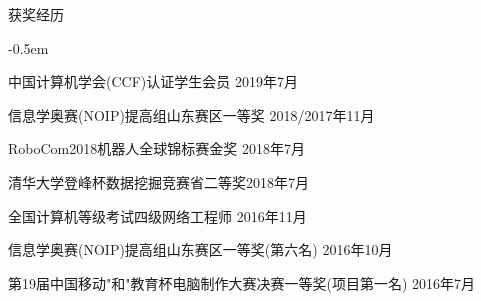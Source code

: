 \documentclass[UTF8]{resume} %
\begin{document}
\begin{rSection}{获奖经历}
    \begin{list}{}{
        \setlength{\leftmargin}{0.0em}
        \itemsep -0.5em
      }

    
    \item 中国计算机学会(CCF)认证学生会员 \hfill 2019年7月

    \item 信息学奥赛(NOIP)提高组山东赛区一等奖 \hfill 2018/2017年11月
    \item RoboCom2018机器人全球锦标赛金奖 \hfill 2018年7月
    \item 清华大学登峰杯数据挖掘竞赛省二等奖\hfill 2018年7月
    \item 全国计算机等级考试四级网络工程师 \hfill 2016年11月
    \item 信息学奥赛(NOIP)提高组山东赛区一等奖(第六名) \hfill 2016年10月
    \item 第19届中国移动"和"教育杯电脑制作大赛决赛一等奖(项目第一名) \hfill 2016年7月
    
    \end{list}
\end{rSection}
\end{document}
